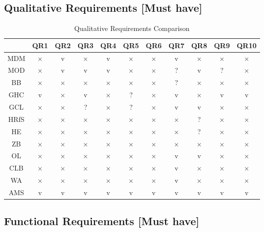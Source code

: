 \subsection{Qualitative Requirements {[}Must have{]}} \label{ssec:eval-qual}

\begin{table}[H]
    \centering
    \bgroup
    \def\arraystretch{1.5}
    \begin{tabular}{|c|c|c|c|c|c|c|c|c|c|c|}
    \hline
         & QR1 & QR2 & QR3 & QR4 & QR5 & QR6 & QR7 & QR8 & QR9 & QR10 \\ \hline
        MDM & × & v & × & v & × & × & v & × & × & × \\ \hline
        MOD & × & v & v & v & × & × & ? & v & ? & × \\ \hline
        BB & × & × & × & × & × & × & ? & × & × & × \\ \hline
        GHC & v & × & v & × & ? & × & v & × & v & v \\ \hline
        GCL & × & × & ? & × & ? & × & v & v & × & × \\ \hline
        HRfS & × & × & × & × & × & × & × & ? & × & × \\ \hline
        HE & × & × & × & × & × & × & × & ? & × & × \\ \hline
        ZB & × & × & × & × & × & × & × & × & × & × \\ \hline
        OL & × & × & × & × & × & × & v & v & × & × \\ \hline
        CLB & × & × & × & × & × & × & v & × & × & × \\ \hline
        WA & × & × & × & × & × & × & v & × & × & × \\ \hline
        AMS & v & v & v & v & v & v & v & v & v & v \\ \hline
    \end{tabular}
    \egroup
    \caption{Qualitative Requirements Comparison}
\end{table}

\subsection{Functional Requirements {[}Must have{]}} \label{ssec:eval-func}

